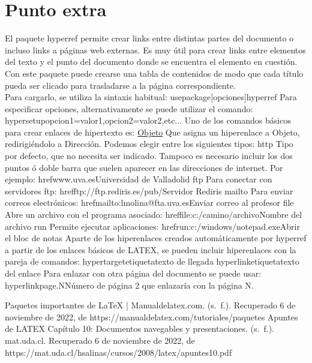 \documentclass[a4paper, 12pt]{article}
\begin{document}
\section{Punto extra}
  El paquete hyperref permite crear links entre distintas partes del documento o incluso links a páginas web externas. Es muy útil para crear links entre elementos del texto y el punto del documento donde se encuentra el elemento en cuestión. Con este paquete puede crearse una tabla de contenidos de modo que cada título pueda ser clicado para trasladarse a la página correspondiente.\\
  Para cargarlo, se utiliza la sintaxis habitual:
   usepackage[opciones]{hyperref}
  Para especificar opciones, alternativamente se puede utilizar el comando:
    hypersetup{opcion1=valor1,opcion2=valor2,etc...}
    Uno de los comandos básicos para crear enlaces de hipertexto es:
\href{Tipo:Dirección}{Objeto}
Que asigna un hiperenlace a Objeto, redirigiéndolo a Dirección. Podemos elegir entre
los siguientes tipos:
http Tipo por defecto, que no necesita ser indicado. Tampoco es necesario incluir los
dos puntos ó doble barra que suelen aparecer en las direcciones de internet. Por
ejemplo:
href{www.uva.es}{Universidad de Valladolid}
ftp Para conectar con servidores ftp:
href{ftp://ftp.rediris.es/pub/}{Servidor Rediris}
mailto Para enviar correos electrónicos:
href{mailto:lmolina@fta.uva.es}{Enviar correo al profesor}
file Abre un archivo con el programa asociado:
href{file:c:/camino/archivo}{Nombre del archivo}
run Permite ejecutar aplicaciones:
href{run:c:/windows/notepad.exe}{Abrir el bloc de notas}
Aparte de los hiperenlaces creados automáticamente por hyperref a partir de los
enlaces básicos de LATEX, se pueden incluir hiperenlaces con la pareja de comandos:
hypertarget{etiqueta}{texto de llegada}
hyperlink{etiqueta}{texto del enlace}
Para enlazar con otra página del documento se puede usar:
hyperlink{page.N}{Número de página}
2
que enlazaría con la página N.
 \begin{thebibliography}{1}
 \bibitem[1]Paquetes importantes de LaTeX | Manualdelatex.com. (s. f.). Recuperado 6 de noviembre de 2022, de https://manualdelatex.com/tutoriales/paquetes
 \bibitem[2]Apuntes de LATEX Capítulo 10: Documentos navegables y presentaciones. (s. f.). mat.uda.cl. Recuperado 6 de noviembre de 2022, de https://mat.uda.cl/hsalinas/cursos/2008/latex/apuntes10.pdf
 \end{thebibliography}
\end{document}
